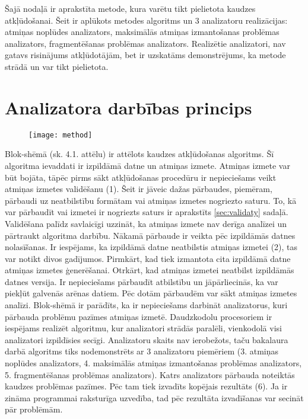 ﻿Šajā nodaļā ir aprakstīta metode, kura varētu tikt pielietota kaudzes atkļūdošanai. Šeit ir aplūkots metodes algoritms un 3 analizatoru realizācijas: atmiņas noplūdes analizators, maksimālās atmiņas izmantošanas problēmas analizators, fragmentēšanas problēmas analizators.
Realizētie analizatori, nav gatavs risinājums atkļūdotājām, bet ir uzskatāms demonstrējums, ka metode strādā un var tikt pielietota.
\section{Analizatora darbības princips}

 \begin{figure}[h]
\begin{center}
\texttt{[image: method]}
\end{center}
\caption{\textbf{\fontsize{11}{12}\selectfont {Uz metodi balstītā algoritma blok-shēma}}}
\end{figure}

Blok-shēmā (sk. 4.1. attēlu) ir attēlots kaudzes atkļūdošanas algoritms.
Šī algoritma ievaddati ir izpildāmā datne un atmiņas izmete.
Atmiņas izmete var būt bojāta, tāpēc pirms sākt atkļūdošanas procedūru ir nepieciešams veikt atmiņas izmetes validēšanu (1).
Šeit ir jāveic dažas pārbaudes, piemēram, pārbaudi uz neatbilstību formātam vai atmiņas izmetes nogriezto saturu.
To, kā var pārbaudīt vai izmetei ir nogriezts saturs ir aprakstīts \ref{sec:validaty} sadaļā.
Validēšana palīdz savlaicīgi uzzināt, ka atmiņas izmete nav derīga analīzei un pārtraukt algoritma darbību.
Nākamā pārbaude ir veikta pēc izpildāmās datnes nolasīšanas.
Ir iespējams, ka izpildāmā datne neatbilstis atmiņas izmetei (2), tas var notikt divos gadījumos.
Pirmkārt, kad tiek izmantota cita izpildāmā datne atmiņas izmetes ģenerēšanai.
Otrkārt, kad atmiņas izmetei neatbilst izpildāmās datnes versija.
Ir nepieciešams pārbaudīt atbilstību un jāpārliecinās, ka var piekļūt galvenās arēnas datiem.
Pēc dotām pārbaudēm var sākt atmiņas izmetes analīzi.
Blok-shēmā ir parādīts, ka ir nepieciešams darbināt analizatorus, kuri  pārbauda problēmu pazīmes atmiņas izmetē.
Daudzkodolu procesoriem ir iespējams realizēt algoritmu, kur analizatori strādās paralēli, vienkodolā visi analizatori izpildīsies secīgi.
Analizatoru skaits nav ierobežots, taču bakalaura darbā algoritms tiks nodemonstrēts ar 3 analizatoru piemēriem (3. atmiņas noplūdes analizators, 4. maksimālās atmiņas izmantošanas problēmas analizators, 5. fragmentēšanas problēmas analizators).
Katrs analizators pārbauda noteiktās kaudzes problēmas pazīmes.
Pēc tam tiek izvadīts kopējais rezultāts (6).
Ja ir zināma programmai raksturīga uzvedība, tad pēc rezultāta izvadīšanas var secināt pār problēmām.


